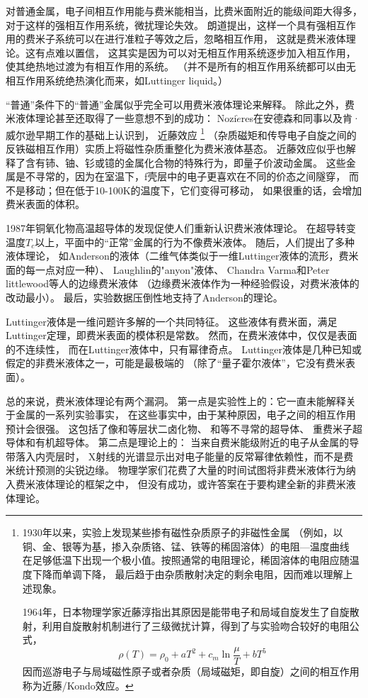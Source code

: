 \documentclass{article}
\begin{document}
对普通金属，电子间相互作用能与费米能相当，比费米面附近的能级间距大得多，
对于这样的强相互作用系统，微扰理论失效。
朗道提出，这样一个具有强相互作用的费米子系统可以在进行准粒子等效之后，忽略相互作用，
这就是费米液体理论。这有点难以置信，
这其实是因为可以对无相互作用系统逐步加入相互作用，
使其绝热地过渡为有相互作用的系统。
（并不是所有的相互作用系统都可以由无相互作用系统绝热演化而来，如Luttinger liquid。）

“普通”条件下的“普通”金属似乎完全可以用费米液体理论来解释。
除此之外，费米液体理论甚至还取得了一些意想不到的成功：
Nozi$\grave{e}$res在安德森和同事以及肯·威尔逊早期工作的基础上认识到，
近藤效应
\footnote{
1930年以来，实验上发现某些掺有磁性杂质原子的非磁性金属
（例如，以铜、金、银等为基，掺入杂质铬、锰、铁等的稀固溶体）的电阻---温度曲线
在足够低温下出现一个极小值。按照通常的电阻理论，稀固溶体的电阻应随温度下降而单调下降，
最后趋于由杂质散射决定的剩余电阻，因而难以理解上述现象。

1964年，日本物理学家近藤淳指出其原因是能带电子和局域自旋发生了自旋散射，利用自旋散射机制进行了三级微扰计算，得到了与实验吻合较好的电阻公式，
$$
        \rho(T)=\rho_{0}+a T^{2}+c_{m}\ln\frac{\mu}{T}+b T^{5}
$$
因而巡游电子与局域磁性原子或者杂质（局域磁矩，即自旋）之间的相互作用称为近藤/Kondo效应。
}
（杂质磁矩和传导电子自旋之间的反铁磁相互作用）实质上将磁性杂质重整化为费米液体基态。
近藤效应似乎也解释了含有铈、铀、钐或镱的金属化合物的特殊行为，即量子价波动金属。
这些金属是不寻常的，因为在室温下，f壳层中的电子更喜欢在不同的价态之间隧穿，
而不是移动；但在低于10-100K的温度下，它们变得可移动，
如果很重的话，会增加费米表面的体积。


1987年铜氧化物高温超导体的发现促使人们重新认识费米液体理论。
在超导转变温度$T_c$以上，平面中的“正常”金属的行为不像费米液体。
随后，人们提出了多种液体理论，
如Anderson的液体（二维气体类似于一维Luttinger液体的流形，费米面的每一点对应一种）、
Laughlin的"anyon"液体、
Chandra Varma和Peter littlewood等人的边缘费米液体
（边缘费米液体作为一种经验假设，对费米液体的改动最小）。
最后，实验数据压倒性地支持了Anderson的理论。

Luttinger液体是一维问题许多解的一个共同特征。
这些液体有费米面，满足Luttinger定理，即费米表面的模体积是常数。
然而，在费米液体中，仅仅是表面的不连续性，
而在Luttinger液体中，只有幂律奇点。
Luttinger液体是几种已知或假定的非费米液体之一，可能是最极端的
（除了“量子霍尔液体”，它没有费米表面）。

总的来说，费米液体理论有两个漏洞。
第一点是实验性上的：它一直未能解释关于金属的一系列实验事实，
在这些事实中，由于某种原因，电子之间的相互作用预计会很强。
这包括了像和等层状二卤化物、
和等不寻常的超导体、
重费米子超导体和有机超导体。
第二点是理论上的：
当来自费米能级附近的电子从金属的导带落入内壳层时，
X射线的光谱显示出对电子能量的反常幂律依赖性，而不是费米统计预测的尖锐边缘。 
物理学家们花费了大量的时间试图将非费米液体行为纳入费米液体理论的框架之中，
但没有成功，或许答案在于要构建全新的非费米液体理论。
\end{document}
